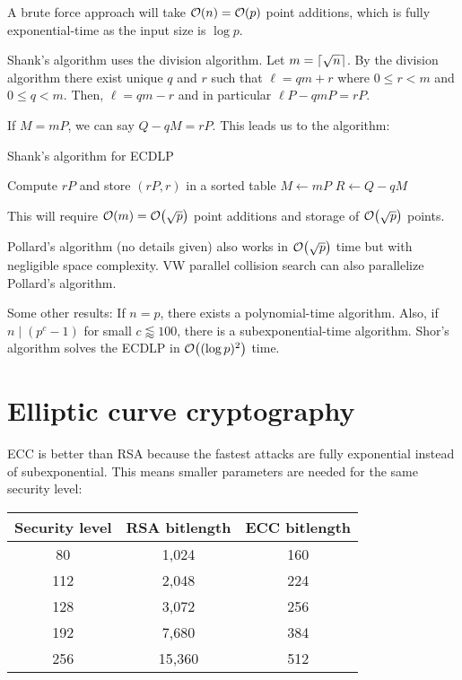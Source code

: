 \documentclass[class=co487,tikz,minted,notes]{agony}
\begin{document}
A brute force approach will take $\order{n} = \order{p}$ point additions,
which is fully exponential-time as the input size is $\log p$.

Shank's algorithm uses the division algorithm.
Let $m = \lceil\sqrt{n}\rceil$. By the division algorithm there exist unique
$q$ and $r$ such that $\ell = qm + r$ where $0 \leq r < m$ and $0 \leq q < m$.
Then, $\ell = qm - r$ and in particular $\ell P - qm P = rP$.

If $M = mP$, we can say $Q - qM = rP$. This leads us to the algorithm:

\begin{algorithm}[H]
  \caption{Shank's algorithm for ECDLP}
  \begin{algorithmic}[1]
      \State Compute $rP$ and store $(rP, r)$ in a sorted table
    \EndFor
    \State $M \gets mP$
      \State $R \gets Q - qM$
        \State {}
      \EndIf
    \EndFor
  \end{algorithmic}
\end{algorithm}

This will require $\order{m} = \order{\sqrt{p}}$ point additions and storage of $\order{\sqrt{p}}$ points.

Pollard's algorithm (no details given) also works in $\order{\sqrt{p}}$ time
but with negligible space complexity.
VW parallel collision search can also parallelize Pollard's algorithm.

Some other results: If $n = p$, there exists a polynomial-time algorithm.
Also, if $n \mid (p^c-1)$ for small $c \lessapprox 100$, there is a subexponential-time algorithm.
Shor's algorithm solves the ECDLP in $\order{(\log p)^2}$ time.

\section{Elliptic curve cryptography}

ECC is better than RSA because the fastest attacks are fully exponential instead of subexponential.
This means smaller parameters are needed for the same security level:

\begin{center}
  \begin{tabular}{c|cc}
    Security level & RSA bitlength & ECC bitlength \\ \hline
    80             & 1,024         & 160           \\
    112            & 2,048         & 224           \\
    128            & 3,072         & 256           \\
    192            & 7,680         & 384           \\
    256            & 15,360        & 512
  \end{tabular}
\end{center}
\end{document}
